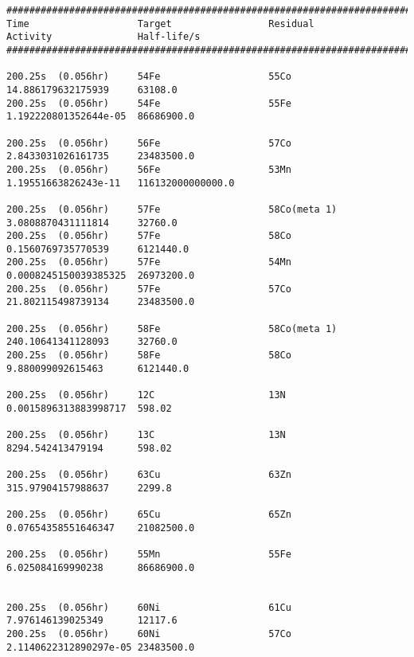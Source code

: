 \begin{lstlisting}[style=sOutputFile,caption={Final results for steel irradiation},label={listing:alexsteel}]
####################################################################################################################
Time                   Target                 Residual               Activity               Half-life/s            
####################################################################################################################

200.25s  (0.056hr)     54Fe                   55Co                   14.886179632175939     63108.0               
200.25s  (0.056hr)     54Fe                   55Fe                   1.192220801352644e-05  86686900.0            

200.25s  (0.056hr)     56Fe                   57Co                   2.8433031026161735     23483500.0            
200.25s  (0.056hr)     56Fe                   53Mn                   1.19551663826243e-11   116132000000000.0     

200.25s  (0.056hr)     57Fe                   58Co(meta 1)           3.0808870431111814     32760.0               
200.25s  (0.056hr)     57Fe                   58Co                   0.1560769735770539     6121440.0             
200.25s  (0.056hr)     57Fe                   54Mn                   0.0008245150039385325  26973200.0            
200.25s  (0.056hr)     57Fe                   57Co                   21.802115498739134     23483500.0            

200.25s  (0.056hr)     58Fe                   58Co(meta 1)           240.10641341128093     32760.0               
200.25s  (0.056hr)     58Fe                   58Co                   9.880099092615463      6121440.0             

200.25s  (0.056hr)     12C                    13N                    0.0015896313883998717  598.02                

200.25s  (0.056hr)     13C                    13N                    8294.542413479194      598.02                

200.25s  (0.056hr)     63Cu                   63Zn                   315.97904157988637     2299.8                

200.25s  (0.056hr)     65Cu                   65Zn                   0.07654358551646347    21082500.0            

200.25s  (0.056hr)     55Mn                   55Fe                   6.025084169990238      86686900.0            


200.25s  (0.056hr)     60Ni                   61Cu                   7.976146139025349      12117.6               
200.25s  (0.056hr)     60Ni                   57Co                   2.1140622312890297e-05 23483500.0            


\end{lstlisting}
